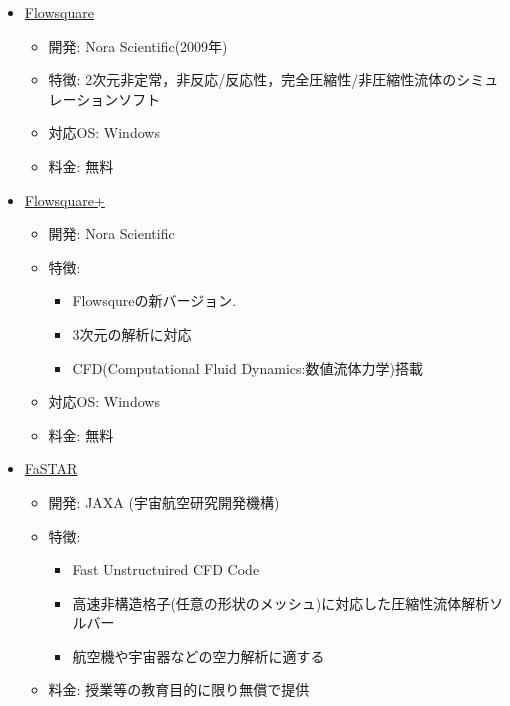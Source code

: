     
        \begin{itemize}
        \item \href{http://flowsquare.com/jp/}{Flowsquare}
            \begin{itemize}
            \item 開発: Nora Scientific(2009年)
            \item 特徴: 2次元非定常，非反応/反応性，完全圧縮性/非圧縮性流体のシミュレーションソフト 
            \item 対応OS: Windows
            \item 料金: 無料
            \end{itemize}
            
        \item \href{https://fsp.norasci.com/}{Flowsquare+}
            \begin{itemize}
            \item 開発: Nora Scientific
            \item 特徴:
                \begin{itemize}
                \item Flowsqureの新バージョン.
                \item 3次元の解析に対応
                \item CFD(Computational Fluid Dynamics:数値流体力学)搭載
                \end{itemize}
            \item 対応OS: Windows
            \item 料金: 無料
            \end{itemize}
            
        \item \href{https://fastar.chofu.jaxa.jp/}{FaSTAR}
            \begin{itemize}
            \item 開発: JAXA (宇宙航空研究開発機構)
            \item 特徴: 
                \begin{itemize}
                \item Fast Unstructuired CFD Code
                \item 高速非構造格子(任意の形状のメッシュ)に対応した圧縮性流体解析ソルバー
                \item 航空機や宇宙器などの空力解析に適する
                \end{itemize}
            \item 料金: 授業等の教育目的に限り無償で提供
            \end{itemize}
            

\end{itemize}
